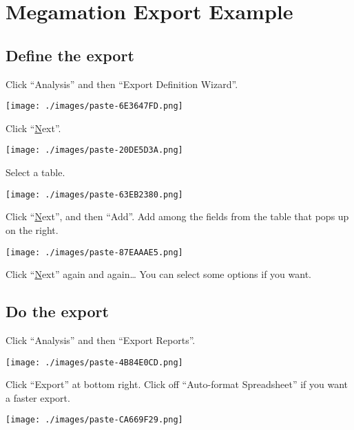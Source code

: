 \documentclass[
  letterpaper,
  DIV=11,
  numbers=noendperiod,
  oneside]{scrreprt}
\begin{document}
\hypertarget{megamation-export-example}{%
\section{Megamation Export Example}\label{megamation-export-example}}

\hypertarget{define-the-export}{%
\subsection{Define the export}\label{define-the-export}}

Click ``Analysis'' and then ``Export Definition Wizard''.

\texttt{[image: ./images/paste-6E3647FD.png]}

Click ``\uline{N}ext''.

\texttt{[image: ./images/paste-20DE5D3A.png]}

Select a table.

\texttt{[image: ./images/paste-63EB2380.png]}

Click ``\uline{N}ext'', and then ``Add''. Add among the fields from the
table that pops up on the right.

\texttt{[image: ./images/paste-87EAAAE5.png]}

Click ``\uline{N}ext'' again and again\ldots{} You can select some
options if you want.

\hypertarget{do-the-export}{%
\subsection{Do the export}\label{do-the-export}}

Click ``Analysis'' and then ``Export Reports''.

\texttt{[image: ./images/paste-4B84E0CD.png]}

Click ``Export'' at bottom right. Click off ``Auto-format Spreadsheet''
if you want a faster export.

\texttt{[image: ./images/paste-CA669F29.png]}
{}
\end{document}
